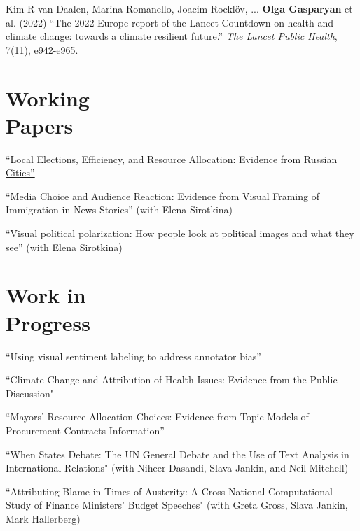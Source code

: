 \documentclass[margin,line,10.95pt]{res}
\begin{document}
\begin{resume}
\vspace*{-2.5mm}

Kim R van Daalen, Marina Romanello, Joacim Rocklöv, ... \textbf{Olga Gasparyan} et al. (2022) ``The 2022 Europe report of the Lancet Countdown on health and climate change: towards a climate resilient future.'' \textit{The Lancet Public Health}, 7(11), e942-e965.


\section{\sc Working \\ Papers}
\href{https://olgasparyan.com/documents/jmp_feb.pdf}{``Local Elections, Efficiency, and Resource Allocation: Evidence from Russian Cities''}

\vspace*{-2.5mm}

``Media Choice and Audience Reaction: Evidence from Visual Framing of Immigration in News Stories'' (with Elena Sirotkina)

\vspace*{-2.5mm}
``Visual political polarization: How people look at political images and what they see'' (with Elena Sirotkina)


\section{\sc Work in \\ Progress}

``Using visual sentiment labeling to address annotator bias''  


 \vspace*{-3.5mm}
``Climate Change and Attribution of Health Issues: Evidence from the Public Discussion" 

\vspace*{-2.5mm}

``Mayors’ Resource Allocation Choices: Evidence from Topic Models of Procurement
Contracts Information''

\vspace*{-3.5mm}
``When States Debate: The UN General Debate and the Use of Text Analysis in International Relations" (with Niheer Dasandi, Slava Jankin, and Neil Mitchell)

\vspace*{-3.5mm}
``Attributing Blame in Times of Austerity: A Cross-National Computational Study of Finance Ministers' Budget Speeches" (with Greta Gross, Slava Jankin, Mark Hallerberg)


\end{resume}
\end{document}
